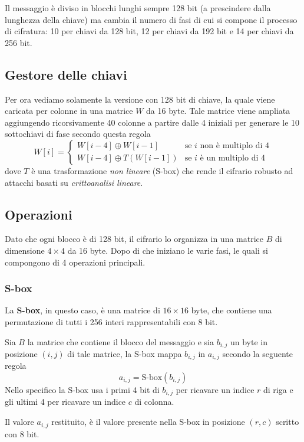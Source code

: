 Il messaggio \`e diviso in blocchi lunghi sempre 128 bit (a prescindere dalla lunghezza della chiave) ma cambia il
numero di fasi di cui si compone il processo di cifratura: 10 per chiavi da 128 bit, 12 per chiavi da 192 bit e 14
per chiavi da 256 bit.

\subsection{Gestore delle chiavi}
Per ora vediamo solamente la versione con 128 bit di chiave, la quale viene caricata per colonne in una matrice $W$ da
16 byte. Tale matrice viene ampliata aggiungendo ricorsivamente 40 colonne a partire dalle 4 iniziali per generare le 10
sottochiavi di fase secondo questa regola
\[
	W[i] = \begin{cases}
		W[i - 4] \oplus W[i - 1]    & \text{se $i$ non \`e multiplo di 4} \\
		W[i - 4] \oplus T(W[i - 1]) & \text{se $i$ \`e un multiplo di 4}
	\end{cases}
\]
dove $T$ \`e una trasformazione \emph{non lineare} (S-box) che rende il cifrario robusto ad attacchi basati su
\emph{crittoanalisi lineare}.

\subsection{Operazioni}
Dato che ogni blocco \`e di 128 bit, il cifrario lo organizza in una matrice $B$ di dimensione $4 \times 4$ da 16 byte.
Dopo di che iniziano le varie fasi, le quali si compongono di 4 operazioni principali.

\subsubsection{S-box}
La \textbf{S-box}, in questo caso, \`e una matrice di $16 \times 16$ byte, che contiene una permutazione di tutti i 256
interi rappresentabili con 8 bit.

Sia $B$ la matrice che contiene il blocco del messaggio e sia $b_{i, j}$ un byte in posizione $(i, j)$ di tale matrice,
la S-box mappa $b_{i, j}$ in $a_{i, j}$ secondo la seguente regola
\[ a_{i, j} = \text{S-box}(b_{i, j}) \]
Nello specifico la S-box usa i primi 4 bit di $b_{i, j}$ per ricavare un indice $r$ di riga e gli ultimi 4 per ricavare
un indice $c$ di colonna.

Il valore $a_{i, j}$ restituito, \`e il valore presente nella S-box in posizione $(r, c)$ scritto con 8 bit.

